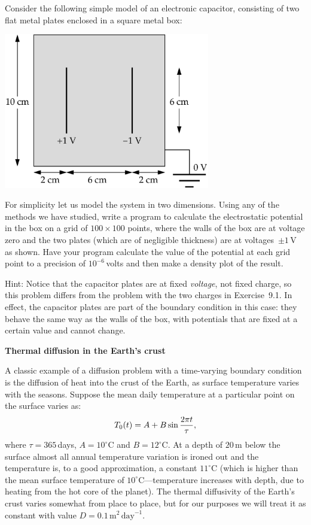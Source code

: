 \documentclass[12pt]{article}
\begin{document}
\begin{exercises}
\exercise Consider the following simple model of an electronic capacitor,
consisting of two flat metal plates enclosed in a square metal box:
\medskip
\begin{center}
\includegraphics[width=9cm]{capacitor.eps}
\end{center}
For simplicity let us model the system in two dimensions.  Using any of the
methods we have studied, write a program to calculate the electrostatic
potential in the box on a grid of $100\times100$ points, where the walls of
the box are at voltage zero and the two plates (which are of negligible
thickness) are at voltages~$\pm1\,$V as shown.  Have your program calculate
the value of the potential at each grid point to a precision of
$10^{-6}\,$volts and then make a density plot of the result.

Hint: Notice that the capacitor plates are at fixed \emph{voltage}, not
fixed charge, so this problem differs from the problem with the two charges
in Exercise~9.1.  In effect, the capacitor plates are part of the boundary
condition in this case: they behave the same way as the walls of the box,
with potentials that are fixed at a certain value and cannot change.



\exercise \textbf{Thermal diffusion in the Earth's crust}

\exskip A classic example of a diffusion problem with a time-varying
boundary condition is the diffusion of heat into the crust of the Earth, as
surface temperature varies with the seasons.  Suppose the mean daily
temperature at a particular point on the surface varies as:
\begin{displaymath}
T_0(t) = A + B\sin {2\pi t\over\tau},
\end{displaymath}
where $\tau=365\,$days, $A=10^\circ$C and $B=12^\circ$C.  At a depth of
$20\,$m below the surface almost all annual temperature variation is ironed
out and the temperature is, to a good approximation, a constant $11^\circ$C
(which is higher than the mean surface temperature of
$10^\circ$C---temperature increases with depth, due to heating from the hot
core of the planet).  The thermal diffusivity of the Earth's crust
varies somewhat from place to place, but for our purposes we will treat it
as constant with value $D=0.1\,\mathrm{m}^2\,\mathrm{day}^{-1}$.


\end{exercises}
\end{document}
